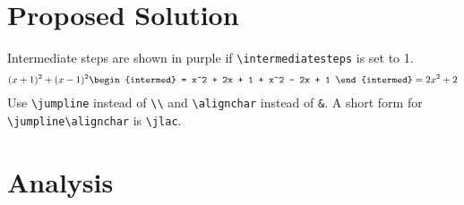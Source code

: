 \documentclass{article}
\begin{document}
\section{Proposed Solution}
\begin{bullets}%
    \blt[intermed] Intermediate steps are shown in purple if \texttt{\textbackslash intermediatesteps} is set to 1.
    \begin{align}
        (x+1)^2 + (x-1)^2
        \alignchar
        \begin{intermed}
            = x^2 + 2x + 1 + x^2 - 2x + 1
        \end{intermed}
        \jlac= 2x^2 + 2
    \end{align}
    Use \texttt{\textbackslash jumpline} instead of \texttt{\textbackslash\textbackslash} and  \texttt{\textbackslash alignchar} instead of \texttt{\&}. A short form for \texttt{\textbackslash jumpline\textbackslash alignchar} is \texttt{\textbackslash jlac}.
\end{bullets}%


\section{Analysis}
\end{document}
